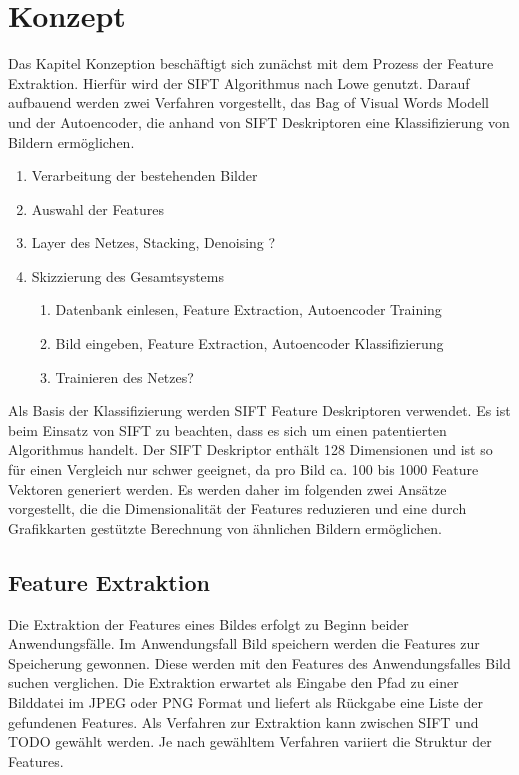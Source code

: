 \chapter{Konzept}

Das Kapitel Konzeption beschäftigt sich zunächst mit dem Prozess der Feature Extraktion. Hierfür wird der SIFT Algorithmus nach Lowe genutzt. Darauf aufbauend werden zwei Verfahren vorgestellt, das Bag of Visual Words Modell und der Autoencoder, die anhand von SIFT Deskriptoren eine Klassifizierung von Bildern ermöglichen.

\begin{enumerate}
	\item Verarbeitung der bestehenden Bilder
	\item Auswahl der Features
	\item Layer des Netzes, Stacking, Denoising ?
	\item Skizzierung des Gesamtsystems \begin{enumerate}
		\item Datenbank einlesen, Feature Extraction, Autoencoder Training
		\item Bild eingeben, Feature Extraction, Autoencoder Klassifizierung
		\item Trainieren des Netzes?
	\end{enumerate}		
	
\end{enumerate}

Als Basis der Klassifizierung werden SIFT Feature Deskriptoren verwendet. Es ist beim Einsatz von SIFT zu beachten, dass es sich um einen patentierten Algorithmus handelt. Der SIFT Deskriptor enthält 128 Dimensionen und ist so für einen Vergleich nur schwer geeignet, da pro Bild ca. 100 bis 1000 Feature Vektoren generiert werden. Es werden daher im folgenden zwei Ansätze vorgestellt, die die Dimensionalität der Features reduzieren und eine durch Grafikkarten gestützte Berechnung von ähnlichen Bildern ermöglichen.

\section{Feature Extraktion}

Die Extraktion der Features eines Bildes erfolgt zu Beginn beider Anwendungsfälle. Im Anwendungsfall Bild speichern werden die Features zur Speicherung gewonnen. Diese werden mit den Features des Anwendungsfalles Bild suchen verglichen. Die Extraktion erwartet als Eingabe den Pfad zu einer Bilddatei im JPEG oder PNG Format und liefert als Rückgabe eine Liste der gefundenen Features.  Als Verfahren zur Extraktion kann zwischen SIFT und TODO gewählt werden. Je nach gewähltem Verfahren variiert die Struktur der Features.

